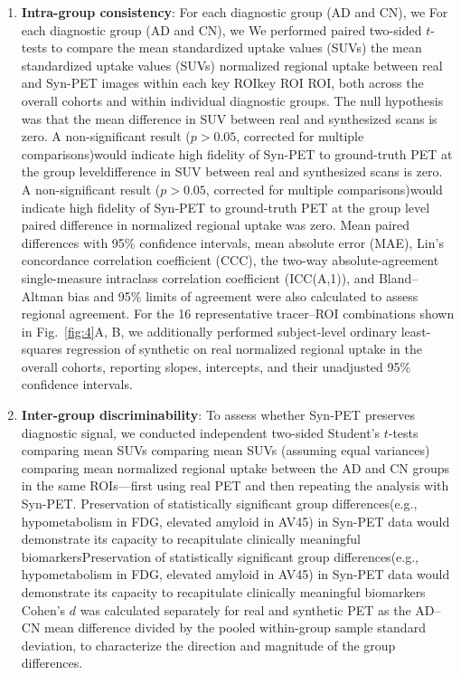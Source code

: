 \documentclass{article}
\providecommand{\DIFaddtex}[1]{{\protect\color{blue} \sf #1}} %
\providecommand{\DIFdeltex}[1]{{\protect\color{red} \ifmmode #1\else\scriptsize #1\fi}} %
\providecommand{\DIFaddbegin}{} %
\providecommand{\DIFaddend}{} %
\providecommand{\DIFdelbegin}{} %
\providecommand{\DIFdelend}{} %
\providecommand{\DIFadd}[1]{\texorpdfstring{\DIFaddtex{#1}}{#1}} %
\providecommand{\DIFdel}[1]{\texorpdfstring{\DIFdeltex{#1}}{}} %
\newcommand{\DIFscaledelfig}{0.5}
\newlength{\DIFdelgraphicswidth} %
\newlength{\DIFdelgraphicsheight} %
\newcommand{\DIFaddincludegraphics}[2][]{{\color{blue}\fbox{\DIFOincludegraphics[#1]{#2}}}} %
\newcommand{\DIFdelincludegraphics}[2][]{%
\sbox{\DIFdelgraphicsbox}{\DIFOincludegraphics[#1]{#2}}%
\settoboxwidth{\DIFdelgraphicswidth}{\DIFdelgraphicsbox} %
\settoboxtotalheight{\DIFdelgraphicsheight}{\DIFdelgraphicsbox} %
\scalebox{\DIFscaledelfig}{%
\parbox[b]{\DIFdelgraphicswidth}{\usebox{\DIFdelgraphicsbox}\\[-\baselineskip] \rule{\DIFdelgraphicswidth}{0em}}\llap{\resizebox{\DIFdelgraphicswidth}{\DIFdelgraphicsheight}{%
\setlength{\unitlength}{\DIFdelgraphicswidth}%
\begin{picture}(1,1)%
\thicklines\linethickness{2pt} %
{\color[rgb]{1,0,0}\put(0,0){\framebox(1,1){}}}%
{\color[rgb]{1,0,0}\put(0,0){\line( 1,1){1}}}%
{\color[rgb]{1,0,0}\put(0,1){\line(1,-1){1}}}%
\end{picture}%
}\hspace*{3pt}}} %
} %
\DeclareRobustCommand{\DIFaddbegin}{\DIFOaddbegin \let\includegraphics\DIFaddincludegraphics} %
\DeclareRobustCommand{\DIFaddend}{\DIFOaddend \let\includegraphics\DIFOincludegraphics} %
\DeclareRobustCommand{\DIFdelbegin}{\DIFOdelbegin \let\includegraphics\DIFdelincludegraphics} %
\DeclareRobustCommand{\DIFdelend}{\DIFOaddend \let\includegraphics\DIFOincludegraphics} %
\begin{document}
\begin{enumerate}
    \item \textbf{Intra-group consistency}: \DIFdelbegin \DIFdel{For each diagnostic group (AD and CN), we }\DIFdelend \DIFaddbegin \DIFadd{We }\DIFaddend performed paired two-sided $t$-tests to compare \DIFdelbegin \DIFdel{the mean standardized uptake values (SUVs) }\DIFdelend \DIFaddbegin \DIFadd{normalized regional uptake }\DIFaddend between real and Syn-PET images within each \DIFdelbegin \DIFdel{key ROI}\DIFdelend \DIFaddbegin \DIFadd{ROI, both across the overall cohorts and within individual diagnostic groups}\DIFaddend . The null hypothesis was that the mean \DIFdelbegin \DIFdel{difference in SUV between real and synthesized scans is zero. A non-significant result ($p > 0.05$, corrected for multiple comparisons)would indicate high fidelity of Syn-PET to ground-truth PET at the group level}\DIFdelend \DIFaddbegin \DIFadd{paired difference in normalized regional uptake was zero. Mean paired differences with 95\% confidence intervals, mean absolute error (MAE), Lin's concordance correlation coefficient (CCC), the two-way absolute-agreement single-measure intraclass correlation coefficient (ICC(A,1)), and Bland--Altman bias and 95\% limits of agreement were also calculated to assess regional agreement. For the 16 representative tracer--ROI combinations shown in Fig.~\ref{fig:4}A, B, we additionally performed subject-level ordinary least-squares regression of synthetic on real normalized regional uptake in the overall cohorts, reporting slopes, intercepts, and their unadjusted 95\% confidence intervals}\DIFaddend .

    \item \textbf{Inter-group discriminability}: To assess whether Syn-PET preserves diagnostic signal, we conducted independent two-sided \DIFaddbegin \DIFadd{Student's }\DIFaddend $t$-tests \DIFdelbegin \DIFdel{comparing mean SUVs }\DIFdelend \DIFaddbegin \DIFadd{(assuming equal variances) comparing mean normalized regional uptake }\DIFaddend between the AD and CN groups in the same ROIs—first using real PET and then repeating the analysis with Syn-PET. \DIFdelbegin \DIFdel{Preservation of statistically significant group differences(e.g., hypometabolism in FDG, elevated amyloid in AV45) in Syn-PET data would demonstrate its capacity to recapitulate clinically meaningful biomarkers}\DIFdelend \DIFaddbegin \DIFadd{Cohen's $d$ was calculated separately for real and synthetic PET as the AD--CN mean difference divided by the pooled within-group sample standard deviation, to characterize the direction and magnitude of the group differences}\DIFaddend .
\end{enumerate}
\end{document}
